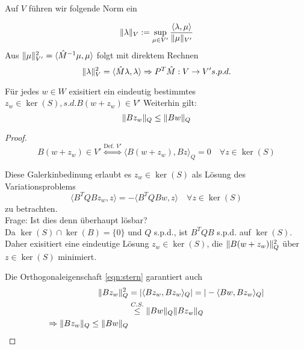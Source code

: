 Auf $V$ führen wir folgende Norm ein 
\begin{definition}
  \[
    \|\lambda\|_V:=\sup_{\mu\in V'} \frac{\langle \lambda, \mu\rangle}{\|\mu\|_{V'}}
  \]
  Aus $\|\mu\|_{V'}^2 = \langle \hat{M}^{-1}\mu, \mu\rangle$ folgt mit direktem Rechnen
  \[
    \|\lambda\|_V^2 = \langle \hat{M}\lambda,\lambda\rangle \\
    \Rightarrow P^T\hat{M}: V\to V's.p.d.
  \]
\end{definition}

\begin{lemma}
  Für jedes $w\in W$ exisitiert ein eindeutig bestimmtes $z_w\in \ker(S), s.d. B(w+z_w)\in V'$
  Weiterhin gilt: %
  \[
    \|Bz_w\|_Q \leq \|Bw\|_Q
  \]
  \label{}
\end{lemma}

\begin{proof}
  \[
    B(w+z_w)\in V' \overset{\text{Def. } V'}{\Leftrightarrow} \langle B(w+z_w), Bz\rangle_Q = 0 \quad \forall z\in \ker(S)
  \]

  Diese Galerkinbedinung erlaubt es $z_w\in \ker(S)$ als Lösung des Variationsproblems 
  \begin{equation}
    \label{eqn:stern}
    \tag{$*$}
    \langle B^TQBz_w,z\rangle = -\langle B^TQBw,z\rangle \quad \forall z\in\ker(S)
  \end{equation}
  zu betrachten.\\
  
  Frage: Ist dies denn überhaupt lösbar? \\

  Da $\ker(S) \cap \ker(B) = \{0\}$ und $Q$ s.p.d., ist $B^TQB$ s.p.d. auf $\ker(S)$. Daher exisitiert eine eindeutige Lösung $z_w\in\ker(S)$, die $\|B(w+z_w)\|_Q^2$ über $z\in\ker(S)$ minimiert. 
  
  Die Orthogonaleigenschaft \eqref{eqn:stern} garantiert auch
  \begin{align*}
    \|Bz_w\|_Q^2 &= |\langle Bz_w,Bz_w\rangle_Q| = |-\langle Bw, Bz_w\rangle_Q|\\
    &\overset{C.S.}{\leq} \|Bw\|_Q \|Bz_w\|_Q\\
    \Rightarrow \|Bz_w\|_Q \leq \|Bw\|_Q
  \end{align*}
\end{proof}



